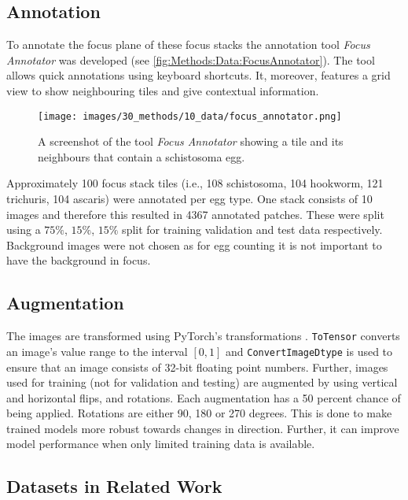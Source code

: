 \subsection{Annotation}
\label{sec:Methods:Data:Annotation}

To annotate the focus plane of these focus stacks the annotation tool \emph{Focus Annotator} \cite{kuchelmeister2022focus} was developed (see \autoref{fig:Methods:Data:FocusAnnotator}). The tool allows quick annotations using keyboard shortcuts. It, moreover, features a grid view to show neighbouring tiles and give contextual information.

\begin{figure}
    \centering
    \texttt{[image: images/30\_methods/10\_data/focus\_annotator.png]}
    \caption{A screenshot of the tool \emph{Focus Annotator} showing a tile and its neighbours that contain a schistosoma egg.}
    \label{fig:Methods:Data:FocusAnnotator}
\end{figure}


Approximately 100 focus stack tiles (i.e., 108 schistosoma, 104 hookworm, 121 trichuris, 104 ascaris) were annotated per egg type. One stack consists of 10 images and therefore this resulted in 4367 annotated patches. These were split using a $75\%$, $15\%$, $15\%$ split for training validation and test data respectively. Background images were not chosen as for egg counting it is not important to have the background in focus.

\subsection{Augmentation}
\label{sec:Methods:Data:Augmentation}

The images are transformed using PyTorch's transformations \cite{paszke2019pytorch, 2021pytorch}. \texttt{ToTensor} converts an image's value range to the interval $[0, 1]$ and \texttt{ConvertImageDtype} is used to ensure that an image consists of 32-bit floating point numbers. Further, images used for training (not for validation and testing) are augmented by using vertical and horizontal flips, and rotations. Each augmentation has a 50 percent chance of being applied. Rotations are either 90, 180 or 270 degrees.
This is done to make trained models more robust towards changes in direction. Further, it can improve model performance when only limited training data is available. 


\subsection{Datasets in Related Work}
\label{sec:Methods:Data:Related}

